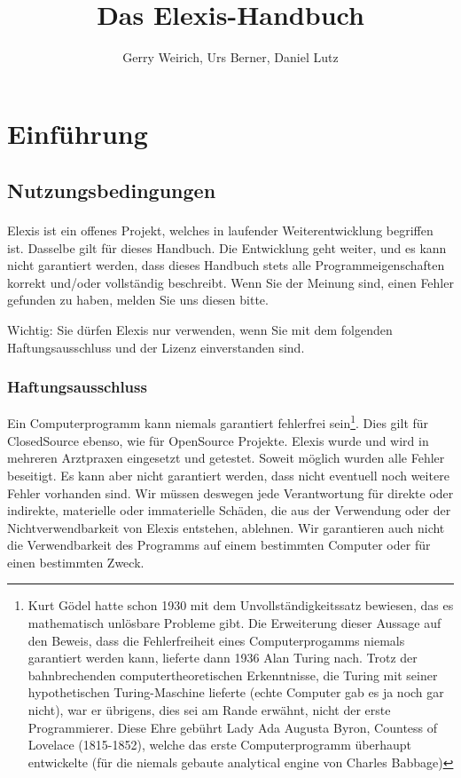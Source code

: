 \documentclass[paper=a4,BCOR8.25mm,twoside]{scrbook}
\author{Gerry Weirich, Urs Berner, Daniel Lutz}
\title{Das Elexis\textsuperscript{\textregistered}-Handbuch}
\begin{document}
\maketitle

\tableofcontents

\part{Einführung}
\chapter{Nutzungsbedingungen}
Elexis\textsuperscript{\textregistered} ist ein offenes Projekt, welches in laufender Weiterentwicklung begriffen ist. Dasselbe gilt für dieses Handbuch.
Die Entwicklung geht weiter, und es kann nicht garantiert werden, dass dieses Handbuch stets alle Programmeigenschaften korrekt und/oder vollständig beschreibt. Wenn Sie der Meinung sind, einen Fehler gefunden zu haben, melden Sie uns diesen bitte.

Wichtig: Sie dürfen Elexis nur verwenden, wenn Sie mit dem folgenden Haftungsausschluss und der Lizenz einverstanden sind.

\section{Haftungsausschluss}
Ein Computerprogramm kann niemals garantiert fehlerfrei sein\footnote{Kurt Gödel hatte schon 1930 mit dem Unvollständigkeitssatz bewiesen, das es mathematisch unlösbare Probleme gibt. Die Erweiterung dieser Aussage auf den Beweis, dass die Fehlerfreiheit eines Computerprogamms niemals garantiert werden kann, lieferte dann 1936 Alan Turing nach. Trotz der bahnbrechenden computertheoretischen Erkenntnisse, die Turing mit seiner hypothetischen Turing-Maschine lieferte (echte Computer gab es ja noch gar nicht), war er übrigens, dies sei am Rande erwähnt, nicht der erste Programmierer. Diese Ehre gebührt Lady Ada Augusta Byron, Countess of Lovelace (1815-1852), welche das erste Computerprogramm überhaupt entwickelte (für die niemals gebaute analytical engine von Charles Babbage)}. Dies gilt für ClosedSource ebenso, wie für OpenSource Projekte. Elexis wurde und wird in mehreren Arztpraxen eingesetzt und getestet. Soweit möglich wurden alle Fehler beseitigt. Es kann aber nicht garantiert werden, dass nicht eventuell noch weitere Fehler vorhanden sind. Wir müssen deswegen jede Verantwortung für direkte oder indirekte, materielle oder immaterielle Schäden, die aus der Verwendung oder der Nichtverwendbarkeit von Elexis entstehen, ablehnen. Wir garantieren auch nicht die Verwendbarkeit des Programms auf einem bestimmten Computer oder für einen bestimmten Zweck.
\end{document}
